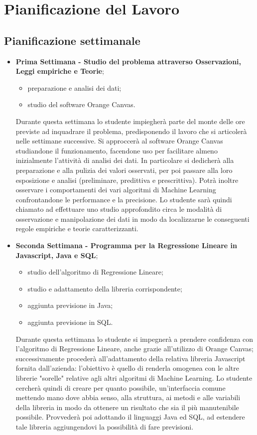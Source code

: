 \section{Pianificazione del Lavoro}
\subsection{Pianificazione settimanale}
\begin{itemize}
\item \textbf{Prima Settimana - Studio del problema attraverso Osservazioni, Leggi empiriche e Teorie};
	\begin{itemize}
	\item preparazione e analisi dei dati;
	\item studio del software Orange Canvas.
	\end{itemize}
	Durante questa settimana lo studente impiegherà parte del monte delle ore previste ad inquadrare il problema, predisponendo il lavoro che si articolerà  nelle settimane successive. Si approccerà al software Orange Canvas studiandone il funzionamento, facendone uso per facilitare almeno inizialmente l'attività di analisi dei dati. In particolare si dedicherà alla  preparazione e alla pulizia dei valori osservati, per poi passare alla loro esposizione e analisi (preliminare, predittiva e prescrittiva). Potrà inoltre osservare i comportamenti dei vari algoritmi di Machine Learning confrontandone le performance e la precisione. Lo studente sarà quindi chiamato ad effettuare uno studio approfondito circa le modalità di osservazione e manipolazione dei dati in modo da localizzarne le conseguenti regole empiriche e teorie caratterizzanti.

\item \textbf{Seconda Settimana - Programma per la Regressione Lineare in Javascript, Java e SQL};
	\begin{itemize}
	\item studio dell'algoritmo di Regressione Lineare;
	\item studio e adattamento della libreria corrispondente;
	\item aggiunta previsione in Java;
	\item aggiunta previsione in SQL.
	\end{itemize}
	Durante questa settimana lo studente si impegnerà a prendere confidenza con l'algoritmo di Regressione Lineare, anche grazie all'utilizzo di Orange Canvas; successivamente procederà all'adattamento della relativa libreria Javascript fornita dall'azienda: l'obiettivo è quello di  renderla omogenea con le altre librerie "sorelle" relative agli altri algoritmi di Machine Learning. Lo studente cercherà quindi di creare per quanto possibile, un'interfaccia comune mettendo mano dove abbia senso, alla struttura, ai metodi e alle variabili della libreria in modo da ottenere un risultato che sia il più manutenibile possibile. Provvederà poi adottando il linguaggi Java ed SQL, ad estendere tale libreria aggiungendovi la possibilità di fare previsioni. 


\end{itemize}

